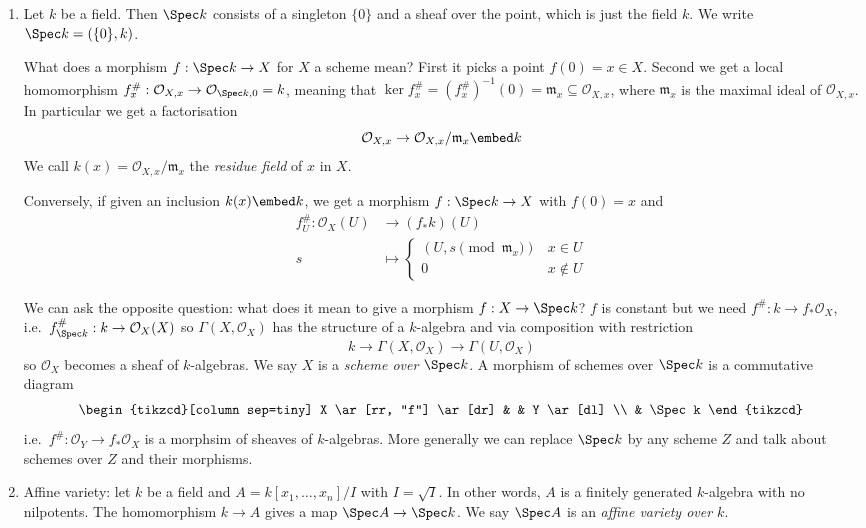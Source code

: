 \documentclass[a4paper]{article}
\newcommand{\sh}[1]{\mathcal{#1}} %
\begin{document}
\begin{eg}\leavevmode
  \begin{enumerate}
  \item Let \(k\) be a field. Then \(\Spec k\) consists of a singleton \(\{0\}\) and a sheaf over the point, which is just the field \(k\). We write \(\Spec k = (\{0\}, k)\).

    What does a morphism \(f: \Spec k \to X\) for \(X\) a scheme mean? First it picks a point \(f(0) = x \in X\). Second we get a local homomorphism \(f_x^\#: \sh O_{X, x} \to \sh O_{\Spec k, 0} = k\), meaning that \(\ker f_x^\# = (f_x^\#)^{-1}(0) = \mathfrak m_x \subseteq \sh O_{X, x}\), where \(\mathfrak m_x\) is the maximal ideal of \(\sh O_{X, x}\). In particular we get a factorisation
    \[
      \sh O_{X, x} \to \sh O_{X, x}/\mathfrak m_x \embed k
    \]
    We call \(k(x) = \sh O_{X, x}/\mathfrak m_x\) the \emph{residue field} of \(x\) in \(X\).

    Conversely, if given an inclusion \(k(x) \embed k\), we get a morphism \(f: \Spec k \to X\) with \(f(0) = x\) and
    \begin{align*}
      f_U^\#: \sh O_X(U) &\to (f_* k)(U) \\
      s &\mapsto
          \begin{cases}
            (U, s \pmod{\mathfrak m_x}) & x \in U \\
            0 & x \notin U
          \end{cases}
    \end{align*}

    We can ask the opposite question: what does it mean to give a morphism \(f: X \to \Spec k\)? \(f\) is constant but we need \(f^\#: k \to f_* \sh O_X\), i.e.\ \(f^\#_{\Spec k}: k \to \sh O_X(X)\) so \(\Gamma(X, \sh O_X)\) has the structure of a \(k\)-algebra and via composition with restriction
    \[
      k \to \Gamma(X, \sh O_X) \to \Gamma(U, \sh O_X)
    \]
    so \(\sh O_X\) becomes a sheaf of \(k\)-algebras. We say \(X\) is a \emph{scheme over \(\Spec k\)}. A morphism of schemes over \(\Spec k\) is a commutative diagram
    \[
      \begin{tikzcd}[column sep=tiny]
        X \ar[rr, "f"] \ar[dr] & & Y \ar[dl] \\
        & \Spec k
      \end{tikzcd}
    \]
    i.e.\ \(f^\#: \sh O_Y \to f_* \sh O_X\) is a morphsim of sheaves of \(k\)-algebras. More generally we can replace \(\Spec k\) by any scheme \(Z\) and talk about schemes over \(Z\) and their morphisms.
  \item Affine variety: let \(k\) be a field and \(A = k[x_1, \dots, x_n]/I\) with \(I = \sqrt I\). In other words, \(A\) is a finitely generated \(k\)-algebra with no nilpotents. The homomorphism \(k \to A\) gives a map \(\Spec A \to \Spec k\). We say \(\Spec A\) is an \emph{affine variety over \(k\)}.


\end{enumerate}
\end{eg}
\end{document}
